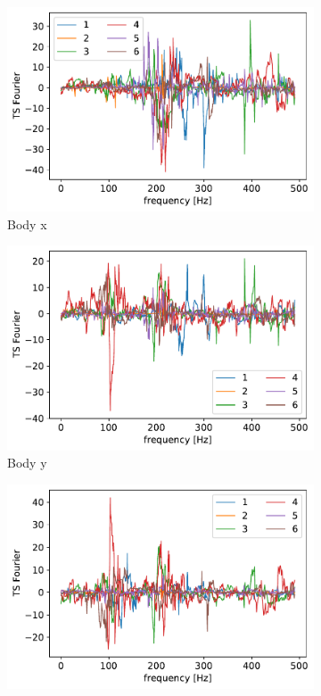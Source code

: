\documentclass[10pt, a4paper, twocolumn]{article}
\begin{document}
\begin{figure}
    \centering
    
    
    \begin{subfigure}[t]{0.3\columnwidth}
    \includegraphics[width=\linewidth]{cluster_body_x.pdf}
    \caption{Body x}
    \label{fig:bxclu}
    \end{subfigure}
    \hfill%
    \begin{subfigure}[t]{0.3\columnwidth}  
    \includegraphics[width=\linewidth]{cluster_body_y.pdf}
    \caption{Body y}
    \label{fig:byclu}
    \end{subfigure}
    \hfill%
    \begin{subfigure}[t]{0.3\columnwidth}
    \includegraphics[width=\linewidth]{cluster_body_z.pdf}

\end{subfigure}
\end{figure}
\end{document}
